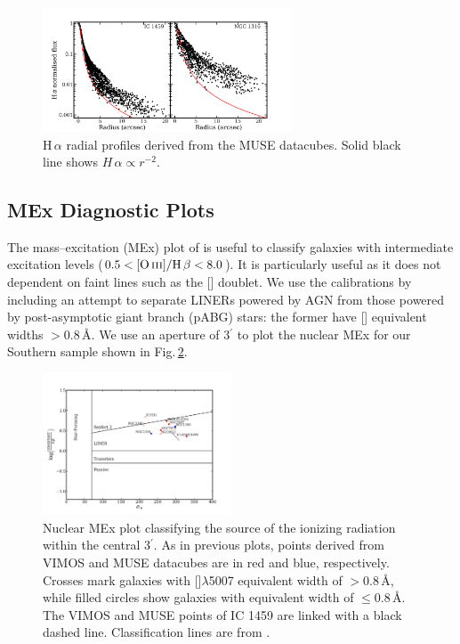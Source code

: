 		\begin{figure}
			\centering
			\includegraphics[width=0.66\textwidth]{chapter5/muse/Halpha_profile.png}
			\caption[MUSE H\,$\alpha$ radial profiles]{H\,$\alpha$ radial profiles derived from the MUSE datacubes. Solid black line shows $H\,\alpha \propto r^{-2}$.} 
			\label{fig:Ha_profile_MUSE}
		\end{figure}


	\subsection{MEx Diagnostic Plots}
		\label{subsec:MEx}
		The mass--excitation (MEx) plot of \citet{Juneau2011} is useful to classify galaxies with intermediate excitation levels ($0.5 < \mathrm{[\ion{O}{iii}]/H\,\beta} < 8.0$). It is particularly useful as it does not dependent on faint lines such as the [] doublet. We use the calibrations by \citet{Nyland2016} including an attempt to separate LINERs powered by AGN from those powered by post-asymptotic giant branch (pABG) stars: the former have [] equivalent widths $>0.8$\,\AA. We use an aperture of 3$^\prime$ to plot the nuclear MEx for our Southern sample shown in Fig.\,\ref{fig:MEx}. 


		\begin{figure}
			\centering
			\includegraphics[width=0.5\textwidth]{chapter5/nuclear_MEx.png}
			\caption[Nuclear mass--excitation plot]{Nuclear MEx plot classifying the source of the ionizing radiation within the central 3$^\prime$. As in previous plots, points derived from VIMOS and MUSE datacubes are in red and blue, respectively. Crosses mark galaxies with []$\lambda$5007 equivalent width of $> 0.8$\,\AA, while filled circles show galaxies with equivalent width of $\leqslant 0.8$\,\AA. The VIMOS and MUSE points of IC 1459 are linked with a black dashed line. Classification lines are from \citet{Nyland2016}.}
			\label{fig:MEx}
		\end{figure}



